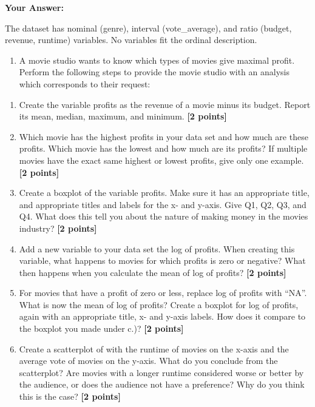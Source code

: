 \documentclass[
]{article}
\providecommand{\tightlist}{%
  \setlength{\itemsep}{0pt}\setlength{\parskip}{0pt}}
\begin{document}
\textbf{Your Answer:}

The dataset has nominal (genre), interval (vote\_average), and ratio
(budget, revenue, runtime) variables. No variables fit the ordinal
description.

\begin{enumerate}
\def\labelenumi{\arabic{enumi}.}
\setcounter{enumi}{2}
\tightlist
\item
  A movie studio wants to know which types of movies give maximal
  profit. Perform the following steps to provide the movie studio with
  an analysis which corresponds to their request:
\end{enumerate}

\begin{enumerate}
\def\labelenumi{\alph{enumi}.}
\tightlist
\item
  Create the variable profits as the revenue of a movie minus its
  budget. Report its mean, median, maximum, and minimum.
  \textbf{[2 points]}
\item
  Which movie has the highest profits in your data set and how much are
  these profits. Which movie has the lowest and how much are its
  profits? If multiple movies have the exact same highest or lowest
  profits, give only one example. \textbf{[2 points]}
\item
  Create a boxplot of the variable profits. Make sure it has an
  appropriate title, and appropriate titles and labels for the x- and
  y-axis. Give Q1, Q2, Q3, and Q4. What does this tell you about the
  nature of making money in the movies industry? \textbf{[2 points]}
\item
  Add a new variable to your data set the log of profits. When creating
  this variable, what happens to movies for which profits is zero or
  negative? What then happens when you calculate the mean of log of
  profits? \textbf{[2 points]}
\item
  For movies that have a profit of zero or less, replace log of profits
  with ``NA''. What is now the mean of log of profits? Create a boxplot
  for log of profits, again with an appropriate title, x- and y-axis
  labels. How does it compare to the boxplot you made under c.)?
  \textbf{[2 points]}
\item
  Create a scatterplot of with the runtime of movies on the x-axis and
  the average vote of movies on the y-axis. What do you conclude from
  the scatterplot? Are movies with a longer runtime considered worse or
  better by the audience, or does the audience not have a preference?
  Why do you think this is the case? \textbf{[2 points]}
\end{enumerate}
\end{document}
